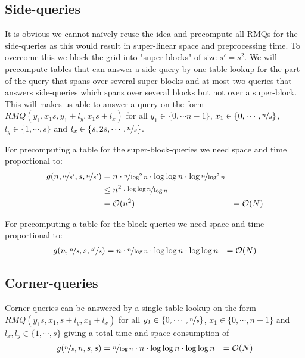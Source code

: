 \documentclass[a4paper,oneside,article,11pt]{memoir}
\begin{document}
\subsection{Side-queries}
It is obvious we cannot naïvely reuse the idea and precompute all RMQs for the side-queries as this would result in super-linear space and preprocessing time. To overcome this we block the grid into "super-blocks" of size $s' = s^2$. We will precompute tables that can answer a side-query by one table-lookup for the part of the query that spans over several super-blocks and at most two queries that answers side-queries which spans over several blocks but not over a super-block. This will makes us able to answer a query on the form $RMQ(y_1,x_1s,y_1+l_y,x_1s+l_x)$ for all $y_1 \in \{0, \cdots n-1 \}$, $x_1 \in \{0, \cdots, \nicefrac{n}{s} \}$, $l_y \in \{1, \cdots, s \}$ and $l_x \in \{s,2s, \cdots, \nicefrac{n}{s} \}$.

For precomputing a table for the super-block-queries we need space and time proportional to:
\begin{align}
g(n, \nicefrac{n}{s'}, s, \nicefrac{n}{s'}) &= n \cdot \nicefrac{n}{\log^2 n} \cdot \log \log n \cdot \log \nicefrac{n}{\log^2 n} \\ &\leq n^2 \cdot \nicefrac{\log \log n}{\log n} \\ &= \mathcal{O}(n^2) &= \mathcal{O}(N)
\end{align}

For precomputing a table for the block-queries we need space and time proportional to:
\begin{align}
g(n, \nicefrac{n}{s}, s, \nicefrac{s'}{s}) &= n \cdot \nicefrac{n}{\log n} \cdot \log \log n \cdot \log \log n &= \mathcal{O}(N)
\end{align}

\subsection{Corner-queries}
Corner-queries can be answered by a single table-lookup on the form \\ $RMQ(y_1s,x_1,s+l_y,x_1+l_x)$ for all $y_1 \in \{0,\cdots,\nicefrac{n}{s} \}$, $x_1 \in \{0, \cdots, n-1 \}$ and $l_x,l_y \in \{1, \cdots, s \}$ giving a total time and space consumption of
\begin{align}
g(\nicefrac{n}{s}, n, s, s) &= \nicefrac{n}{\log n} \cdot n \cdot \log \log n \cdot \log \log n &= \mathcal{O}(N)
\end{align}
\end{document}

